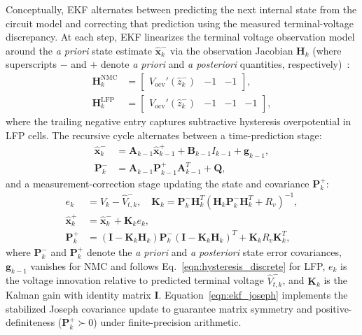 \documentclass[11pt,a4paper]{article}
\begin{document}
Conceptually, EKF alternates between predicting the next internal state from the circuit model and correcting that prediction using the measured terminal-voltage discrepancy. At each step, EKF linearizes the terminal voltage observation model around the \emph{a priori} state estimate $\hat{\mathbf{x}}_k^-$ via the observation Jacobian $\mathbf{H}_k$ (where superscripts $-$ and $+$ denote \emph{a priori} and \emph{a posteriori} quantities, respectively)~\cite{Plett2004part3}:
\begin{align}\label{eqn:ekf_jacobian}
\mathbf{H}_k^{\text{NMC}} &= \begin{bmatrix} V_{\text{ocv}}'(\hat{z}_k^-) & -1 & -1 \end{bmatrix}, \nonumber\\
\mathbf{H}_k^{\text{LFP}} &= \begin{bmatrix} V_{\text{ocv}}'(\hat{z}_k^-) & -1 & -1 & -1 \end{bmatrix},
\end{align}
where the trailing negative entry captures subtractive hysteresis overpotential in LFP cells. The recursive cycle alternates between a time-prediction stage:
\begin{align}
\hat{\mathbf{x}}_k^- &= \mathbf{A}_{k-1} \hat{\mathbf{x}}_{k-1}^+ + \mathbf{B}_{k-1} I_{k-1} + \mathbf{g}_{k-1}, \label{eqn:ekf_pred_state}\\
\mathbf{P}_k^- &= \mathbf{A}_{k-1} \mathbf{P}_{k-1}^+ \mathbf{A}_{k-1}^T + \mathbf{Q}, \label{eqn:ekf_pred_cov}
\end{align}
and a measurement-correction stage updating the state and covariance $\mathbf{P}_k^+$:
\begin{align}
e_k &= V_k - \hat{V}_{t,k}^-, \quad \mathbf{K}_k = \mathbf{P}_k^- \mathbf{H}_k^T \left( \mathbf{H}_k \mathbf{P}_k^- \mathbf{H}_k^T + R_v \right)^{-1}, \label{eqn:ekf_gain}\\
\hat{\mathbf{x}}_k^+ &= \hat{\mathbf{x}}_k^- + \mathbf{K}_k e_k, \label{eqn:ekf_upd_state}\\
\mathbf{P}_k^+ &= (\mathbf{I} - \mathbf{K}_k \mathbf{H}_k) \mathbf{P}_k^- (\mathbf{I} - \mathbf{K}_k \mathbf{H}_k)^T + \mathbf{K}_k R_v \mathbf{K}_k^T, \label{eqn:ekf_joseph}
\end{align}
where $\mathbf{P}_k^-$ and $\mathbf{P}_k^+$ denote the \emph{a priori} and \emph{a posteriori} state error covariances, $\mathbf{g}_{k-1}$ vanishes for NMC and follows Eq.~\eqref{eqn:hysteresis_discrete} for LFP, $e_k$ is the voltage innovation relative to predicted terminal voltage $\hat{V}_{t,k}^-$, and $\mathbf{K}_k$ is the Kalman gain with identity matrix $\mathbf{I}$. Equation~\eqref{eqn:ekf_joseph} implements the stabilized Joseph covariance update to guarantee matrix symmetry and positive-definiteness ($\mathbf{P}_k^+ \succ 0$) under finite-precision arithmetic.
\end{document}
